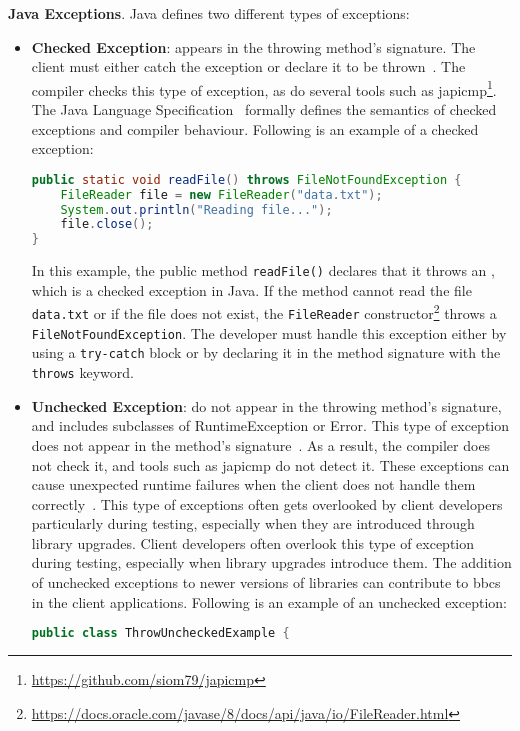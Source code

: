 \textbf{Java Exceptions}. Java defines two different types of exceptions:
\begin{itemize}
    \item \textbf{Checked Exception}: appears in the throwing method's signature. The client must either catch the exception or declare it to be
    thrown~\cite{Sousa2020evolution}. The compiler checks this type of exception, as do several tools
    such as japicmp\footnote{\url{https://github.com/siom79/japicmp}}. The Java Language Specification~\cite{Gosling2021java}
    formally defines the semantics of checked exceptions and compiler behaviour. Following is an example
    of a checked exception:
    \begin{lstlisting}[language=java]
public static void readFile() throws FileNotFoundException {
    FileReader file = new FileReader("data.txt");
    System.out.println("Reading file...");
    file.close();
}
    \end{lstlisting}
    In this example, the public method \texttt{readFile()} declares that it throws an \texttt{},
    which is a checked exception in Java. If the method cannot read the file \texttt{data.txt}
    or if the file does not exist, the \texttt{FileReader} constructor\footnote{\url{https://docs.oracle.com/javase/8/docs/api/java/io/FileReader.html}} throws a \texttt{FileNotFoundException}.
    The developer must handle this exception either by using a \texttt{try-catch} block or by declaring
    it in the method signature with the \texttt{throws} keyword.

    \item \textbf{Unchecked Exception}: do not appear in the throwing method's
    signature, and includes subclasses of RuntimeException or Error. This type
    of exception does not appear in the method's signature~\cite{Asaduzzaman2017}. As a result, the
    compiler does not check it, and tools such as japicmp do not detect it. These exceptions
    can cause unexpected runtime failures when the client does not handle them correctly~\cite{Padua2017}.
    This type of exceptions often gets overlooked by client developers particularly during testing,
    especially when they are introduced through library upgrades. Client developers often overlook
    this type of exception during testing, especially when library upgrades introduce them. The
    addition of unchecked exceptions to newer versions of libraries can contribute to \gls{bbc}s in
    the client applications. Following is an example of an unchecked exception:
    \begin{lstlisting}[language=java]
public class ThrowUncheckedExample {


\end{lstlisting}
\end{itemize}
